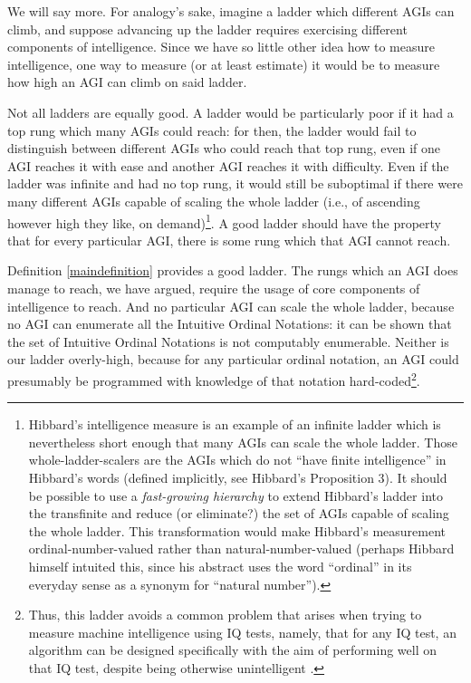 \documentclass[runningheads]{llncs}
\begin{document}
We will say more.
For analogy's sake, imagine a ladder which different AGIs
can climb, and suppose advancing up the ladder requires exercising different
components of intelligence. Since we have so little other idea how to measure
intelligence, one way to measure (or at least estimate) it would be
to measure how high an AGI can climb on said ladder.

Not all ladders are equally good. A ladder would be particularly poor if it had
a top rung which many AGIs could reach: for then, the ladder would fail to
distinguish between different AGIs who could reach that top rung, even if one
AGI reaches it with ease and another AGI reaches it with difficulty.
Even if the ladder was infinite and had no top rung, it would still be suboptimal
if there were many different AGIs capable of scaling the whole
ladder (i.e., of ascending however high they like, on demand)\footnote{Hibbard's
intelligence measure
\cite{hibbard2011measuring} is an example of an infinite ladder
which is nevertheless short enough that many AGIs can
scale the whole ladder. Those whole-ladder-scalers are the AGIs which
do not ``have finite intelligence'' in Hibbard's words
(defined implicitly, see Hibbard's Proposition 3). It should be possible to
use a \emph{fast-growing hierarchy}
\cite{fairtlough1998hierarchies} \cite{weiermann2002slow}
to extend Hibbard's ladder into the transfinite and reduce (or eliminate?)
the set of AGIs capable of scaling the whole ladder. This transformation would make
Hibbard's measurement ordinal-number-valued rather than natural-number-valued
(perhaps Hibbard himself intuited this, since his abstract uses the
word ``ordinal''
in its everyday sense as a synonym for ``natural number'').}.
A good ladder
should have the property that for every particular AGI, there is some rung which
that AGI cannot reach.

Definition \ref{maindefinition} provides a good ladder.
The rungs which an AGI does
manage to reach, we have argued, require the usage of core components of intelligence
to reach.
And no particular AGI can scale
the whole ladder,
because no AGI can enumerate all the Intuitive Ordinal Notations: it can
be shown
that the set of Intuitive Ordinal Notations is not computably enumerable.
Neither is our ladder overly-high, because for any particular
ordinal notation, an AGI could presumably be programmed with knowledge of that notation
hard-coded\footnote{Thus, this ladder avoids a common problem that arises when
trying to measure machine intelligence using IQ tests, namely, that for any IQ test,
an algorithm can be designed specifically with the aim of performing well on that
IQ test, despite being otherwise unintelligent \cite{besold2015can}.}.
\end{document}
